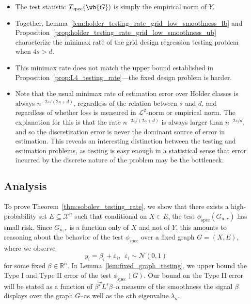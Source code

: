 \documentclass{article}
\newcommand{\Reals}{\mathbb{R}}
\newcommand{\1}{\mathbf{1}}
\newcommand{\Xset}{\mathcal{X}}
\newcommand{\Leb}{\mathcal{L}}
\newcommand{\spec}{\mathrm{spec}}
\theoremstyle{alden}
\theoremstyle{aldenthm}
\theoremstyle{definition}
\theoremstyle{remark}
\begin{document}
\begin{itemize}
	\item The test statistic $T_{\spec}(\wb{G})$ is simply the empirical norm of $Y$. 
	\item Together, Lemma~\ref{lem:holder_testing_rate_grid_low_smoothness_lb} and Proposition~\eqref{prop:holder_testing_rate_grid_low_smoothness_ub} characterize the minimax rate of the grid design regression testing problem when $4s > d$.
	\item This minimax rate does not match the upper bound established in Proposition~\ref{prop:L4_testing_rate}---the fixed design problem is harder. 
	\item Note that the usual minimax rate of estimation error over Holder classes is always $n^{-2s/(2s + d)}$, regardless of the relation between $s$ and $d$, and regardless of whether loss is measured in $\Leb^2$-norm or empirical norm. The explanation for this is that the rate $n^{-2s/(2s + d)}$ is always larger than $n^{-2s/d}$, and so the discretization error is never the dominant source of error in estimation. This reveals an interesting distinction between the testing and estimation problems, as testing is easy enough in a statistical sense that error incurred by the discrete nature of the problem may be the bottleneck.
\end{itemize}



\subsection{Analysis}

To prove Theorem~\ref{thm:sobolev_testing_rate}, we show that there exists a high-probability set $E \subseteq \Xset^n$ such that conditional on $X \in E$, the test $\phi_{\spec}(G_{n,r})$ has small risk. Since $G_{n,r}$ is a function only of $X$ and not of $Y$, this amounts to reasoning about the behavior of the test $\phi_{\spec}$ over a fixed graph $G = (X,E)$, where we observe
\begin{equation}
\label{eqn:fixed_graph_regression_model}
y_i = \beta_i + \varepsilon_i,~~\varepsilon_i \sim \mathcal{N}(0,1)
\end{equation}
for some fixed $\beta \in \Reals^n$.  In Lemma~\ref{lem:fixed_graph_testing}, we upper bound the Type I and Type II error of the test $\phi_{\spec}(G)$. Our bound on the Type II error will be stated as a function of $\beta^T L^s \beta$--a measure of the smoothness the signal $\beta$ displays over the graph $G$--as well as the $\kappa$th eigenvalue $\lambda_{\kappa}$.
\end{document}
